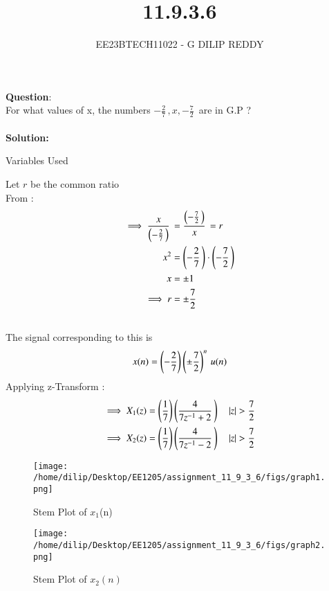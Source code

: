 \documentclass[journal,12pt,twocolumn]{IEEEtran}
\theoremstyle{remark}
\begin{document}

\vspace{3cm}

\title{11.9.3.6}
\author{EE23BTECH11022 - G DILIP REDDY}
\maketitle
\newpage

\bigskip

\renewcommand{\thefigure}{\theenumi}
\renewcommand{\thetable}{\theenumi}
\textbf{Question}:\\
For what values of x, the numbers $-\frac{2}{7}\,,x,-\frac{7}{2}\,$ are in G.P ?
\\\\
\textbf{Solution: }\\
\begin{table}[h]
    \centering
    \renewcommand\thetable{1}
    
    \caption{Variables Used}
    \label{tab:table_11.9.3.6}
\end{table}
Let $r$ be the common ratio\\
From :
\begin{align}
\implies \frac{x}{\left(-\frac{2}{7}\,\right)}\,&= \frac{\left(-\frac{7}{2}\,\right)}{x}\,=r \\
x^2&=\left(-\frac{2}{7}\,\right)\cdot\left(-\frac{7}{2}\,\right)\\
x&=\pm 1\\
\implies r&=\pm \frac{7}{2}\,\\\notag
\end{align}
The signal corresponding to this is 
\begin{align}
x(n)=\left(-\frac{2}{7}\right)\left(\pm \frac{7}{2}\right)^n\,u(n)
\end{align}
Applying z-Transform :
\begin{align}
\implies X_1(z)&=\left(\frac{1}{7}\right)\left(\frac{4}{7z^{-1}+2}\,\right)
\quad \left\vert z\right\vert>\frac{7}{2}\\
\implies X_2(z)&=\left(\frac{1}{7}\right)\left(\frac{4}{7z^{-1}-2}\,\right)
\quad \left\vert z\right\vert>\frac{7}{2}
\end{align}
\begin{figure}[h]
    \renewcommand\thefigure{1}
    \centering
    \captionsetup{justification=centering}
    \texttt{[image: /home/dilip/Desktop/EE1205/assignment\_11\_9\_3\_6/figs/graph1.png]}
    \caption{Stem Plot of $x_1$(n)}
    \label{stemplot1}
\end{figure}
\begin{figure}[h]
    \renewcommand\thefigure{2}
    \centering
    \captionsetup{justification=centering}
    \texttt{[image: /home/dilip/Desktop/EE1205/assignment\_11\_9\_3\_6/figs/graph2.png]}
    \caption{Stem Plot of $x_2(n)$}
    \label{stemplot2}
\end{figure}
\end{document}
